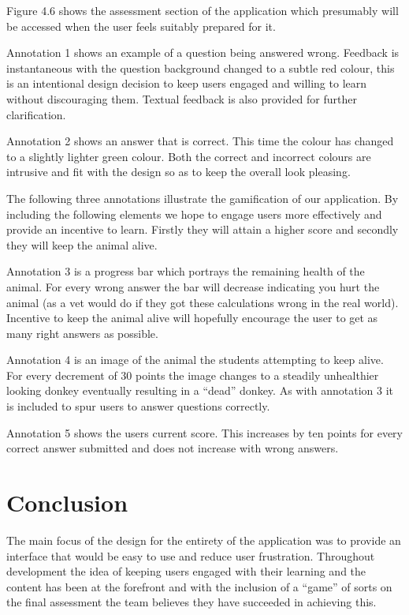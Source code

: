 \documentclass{l3proj}
\begin{document}
Figure 4.6 shows the assessment section of the application which presumably will be accessed when the user feels suitably prepared for it.

Annotation 1 shows an example of a question being answered wrong. Feedback is instantaneous with the question background changed to a subtle red colour, this is an intentional design decision to keep users engaged and willing to learn without discouraging them. Textual feedback is also provided for further clarification. 

Annotation 2 shows an answer that is correct. This time the colour has changed to a slightly lighter green colour. Both the correct and incorrect colours are intrusive and fit with the design so as to keep the overall look pleasing.

The following three annotations illustrate the gamification of our application. By including the following elements we hope to engage users more effectively and provide an incentive to learn. Firstly they will attain a higher score and secondly they will keep the animal alive.

Annotation 3 is a progress bar which portrays the remaining health of the animal. For every wrong answer the bar will decrease indicating you hurt the animal (as a vet would do if they got these calculations wrong in the real world). Incentive to keep the animal alive will hopefully encourage the user to get as many right answers as possible.

Annotation 4 is an image of the animal the students attempting to keep alive. For every decrement of 30 points the image changes to a steadily unhealthier looking donkey eventually resulting in a ``dead'' donkey. As with annotation 3 it is included to spur users to answer questions correctly.

Annotation 5 shows the users current score. This increases by ten points for every correct answer submitted and does not increase with wrong answers. 

\section{Conclusion}

The main focus of the design for the entirety of the application was to provide an interface that would be easy to use and reduce user frustration. Throughout development the idea of keeping users engaged with their learning and the content has been at the forefront and with the inclusion of a ``game'' of sorts on the final assessment the team believes they have succeeded in achieving this.
\end{document}
